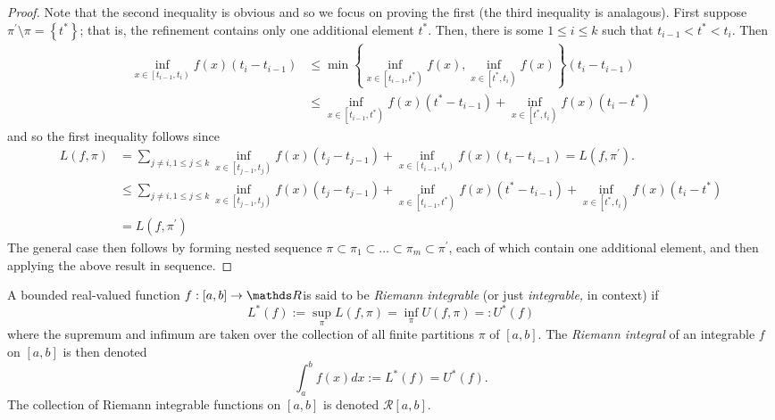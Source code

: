 \begin{proof}
Note that the second inequality is obvious and so we focus on proving
the first (the third inequality is analagous). First suppose $\pi^{\prime}\setminus\pi=\left\{ t^{*}\right\} $;
that is, the refinement contains only one additional element $t^{*}.$
Then, there is some $1\leq i\leq k$ such that $t_{i-1}<t^{*}<t_{i}.$
Then
\begin{align*}
\inf_{x\in\left[t_{i-1},t_{i}\right)}f\left(x\right)\left(t_{i}-t_{i-1}\right) & \leq\min\left\{ \inf_{x\in\left[t_{i-1},t^{*}\right)}f\left(x\right),\inf_{x\in\left[t^{*},t_{i}\right)}f\left(x\right)\right\} \left(t_{i}-t_{i-1}\right)\\
 & \leq\inf_{x\in\left[t_{i-1},t^{*}\right)}f\left(x\right)\left(t^{*}-t_{i-1}\right)+\inf_{x\in\left[t^{*},t_{i}\right)}f\left(x\right)\left(t_{i}-t^{*}\right)
\end{align*}
and so the first inequality follows since
\begin{align*}
L\left(f,\pi\right) & =\sum_{j\neq i,1\leq j\leq k}\inf_{x\in\left[t_{j-1},t_{j}\right)}f\left(x\right)\left(t_{j}-t_{j-1}\right)+\inf_{x\in\left[t_{i-1},t_{i}\right)}f\left(x\right)\left(t_{i}-t_{i-1}\right)=L\left(f,\pi^{\prime}\right).\\
 & \leq\sum_{j\neq i,1\leq j\leq k}\inf_{x\in\left[t_{j-1},t_{j}\right)}f\left(x\right)\left(t_{j}-t_{j-1}\right)+\inf_{x\in\left[t_{i-1},t^{*}\right)}f\left(x\right)\left(t^{*}-t_{i-1}\right)+\inf_{x\in\left[t^{*},t_{i}\right)}f\left(x\right)\left(t_{i}-t^{*}\right)\\
 & =L\left(f,\pi^{\prime}\right)
\end{align*}
The general case then follows by forming nested sequence $\pi\subset\pi_{1}\subset\ldots\subset\pi_{m}\subset\pi^{\prime}$,
each of which contain one additional element, and then applying the
above result in sequence.
\end{proof}
\begin{defn}
\label{def:riemannIntegrable}A bounded real-valued function $f:\left[a,b\right]\to\R$is
said to be \emph{Riemann integrable }(or just \emph{integrable, }in
context) if
\[
L^{*}\left(f\right):=\sup_{\pi}L\left(f,\pi\right)=\inf_{\pi}U\left(f,\pi\right)=:U^{*}\left(f\right)
\]
where the supremum and infimum are taken over the collection of all
finite partitions $\pi$ of $\left[a,b\right]$. The \emph{Riemann
integral }of an integrable $f$ on $\left[a,b\right]$ is then denoted
\[
\int_{a}^{b}f\left(x\right)dx:=L^{*}\left(f\right)=U^{*}\left(f\right).
\]
The collection of Riemann integrable functions on $\left[a,b\right]$
is denoted $\mathcal{R}\left[a,b\right].$
\end{defn}

